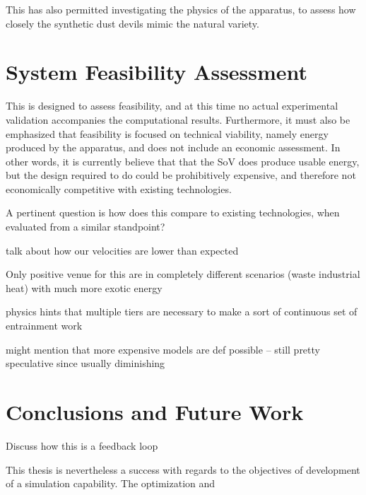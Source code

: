This has also permitted investigating the physics of the apparatus, to
assess how closely the synthetic dust devils mimic the natural
variety. 

%
%
\section{System Feasibility Assessment}


This is designed to assess feasibility, and at this time no 
actual experimental validation accompanies the computational
results. Furthermore, it must also be emphasized that feasibility is
focused on technical viability, namely energy produced by the apparatus,
and does not include an economic assessment. In other words, it is
currently believe that that the SoV does produce usable energy, 
but the design required to do could be prohibitively expensive, and
therefore not economically competitive with existing technologies. 


A pertinent question is how does this compare to existing technologies,
when evaluated from a similar standpoint?

talk about how our velocities are lower than expected



Only positive venue for this are in 
completely different scenarios (waste industrial heat)
with much more exotic energy

physics hints that multiple tiers are necessary to make a sort of
continuous set of entrainment work

might mention that more expensive models are def possible -- still pretty speculative since usually diminishing

\section{Conclusions and Future Work}

Discuss how this is a feedback loop

This thesis is nevertheless a success with regards to the objectives of
development of a simulation capability. The optimization and 

